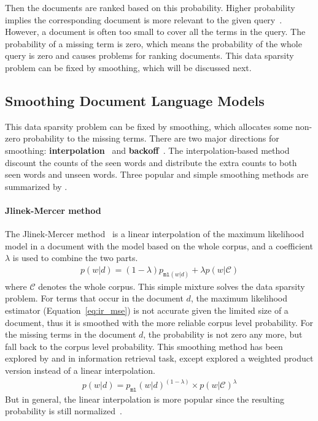 Then the documents are ranked based on this probability. Higher probability implies the corresponding document is more relevant to the given query~\citep{song-99}. However, a document is often too small to cover all the terms in the query. The probability of a missing term is zero, which means the probability of the whole query is zero and causes problems for ranking documents. This data sparsity problem can be fixed by smoothing, which will be discussed next.

\subsection{Smoothing Document Language Models}

This data sparsity problem can be fixed by smoothing, which allocates some non-zero probability to the missing terms. There are two major directions for smoothing: \textbf{interpolation}~\citep{Jelinek-1980,mackay95dirichlet,Ney-1994,PonteCroft,zhai-01} and \textbf{backoff}~\citep{katz-87,song-99}. The interpolation-based method discount the counts of the seen words and distribute the extra counts to both seen words and unseen words. Three popular and simple smoothing methods are summarized by \cite{zhai-01}. 

\paragraph{Jlinek-Mercer method}

The Jlinek-Mercer method~\cite{Jelinek-1980} is a linear interpolation of the maximum likelihood model in a document with the model based on the whole corpus, and a coefficient $\lambda$ is used to combine the two parts. 
\begin{align}
p(w|d) = (1 - \lambda) p_{\texttt{ml}(w|d)} + \lambda p(w|\mathcal{C})
\end{align}
where $\mathcal{C}$ denotes the whole corpus. This simple mixture solves the data sparsity problem. For terms that occur in the document $d$, the maximum likelihood estimator (Equation~\ref{eq:ir_mse}) is not accurate given the limited size of a document, thus it is smoothed with the more reliable corpus level probability. For the missing terms in the document $d$, the probability is not zero any more, but fall back to the corpus level probability. This smoothing method has been explored by \cite{PonteCroft} and \cite{song-99} in information retrieval task, except \cite{PonteCroft} explored a weighted product version instead of a linear interpolation. 
\begin{align}
p(w|d) = p_{\texttt{ml}}(w|d)^{(1 - \lambda) } \times p(w|\mathcal{C})^{\lambda}
\label{eq:lm-jr}
\end{align}
But in general, the linear interpolation is more popular since the resulting probability is still normalized~\citep{song-99}.

